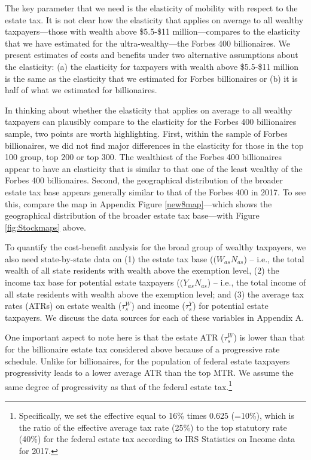 \documentclass[12pt]{article}
\begin{document}
The key parameter that we need is the elasticity of mobility with respect to the estate tax. 
It is not clear how the elasticity that applies on average to all wealthy taxpayers---those with wealth above \$5.5-\$11 million---compares to the elasticity that we have estimated for the ultra-wealthy---the Forbes 400 billionaires.  
We present estimates of costs and benefits under two alternative assumptions about the elasticity: (a) the elasticity for taxpayers with wealth above \$5.5-\$11 million is the same as the elasticity that we estimated for Forbes billionaires or (b) it is half of what we estimated for billionaires. 

In thinking about whether the elasticity that applies on average to all wealthy taxpayers can plausibly compare to the elasticity for the Forbes 400 billionaires sample, two points are worth highlighting.  
First,  within the sample of Forbes billionaires, we did not find major differences in the elasticity for those in the top 100 group, top 200 or top 300.  The wealthiest of the Forbes 400 billionaires appear to have an elasticity that is similar to that one of the least wealthy of the  Forbes 400 billionaires. 
Second, the   geographical distribution of the broader estate tax base appears generally similar to that of the Forbes 400 in 2017. To see this, compare the map in Appendix Figure \ref{new8map}---which shows the geographical distribution of the broader estate tax base---with Figure \ref{fig:Stockmaps} above.   

To quantify the cost-benefit analysis for the broad group of wealthy taxpayers, we also  need  state-by-state data on (1) the estate tax base ($(W_{as} N_{as}$) -- i.e., the total wealth of all state residents with wealth above the exemption level, (2) the income tax base for potential estate taxpayers ($(Y_{as} N_{as}$) -- i.e., the total income of all state residents with wealth above the exemption level; and (3) the average tax rates (ATRs) on estate wealth ($\tau_s^{W}$) and income ($\tau_s^{Y}$) for potential estate taxpayers.  We discuss the data sources for each of these variables in Appendix A. 

One important aspect to note here is that the estate ATR ($\tau_s^{W}$) is lower than that for the billionaire estate tax considered above because of a progressive rate schedule. Unlike for billionaires, for the population of federal estate taxpayers progressivity leads to a lower average ATR than the top MTR. We assume the same degree of progressivity as that of the federal estate tax.\footnote{Specifically, we set the effective equal to 16\% times 0.625 (=10\%), which is the ratio of the effective average tax rate (25\%) to the top statutory rate (40\%) for the federal estate tax according to IRS Statistics on Income data for 2017.} 
\end{document}

